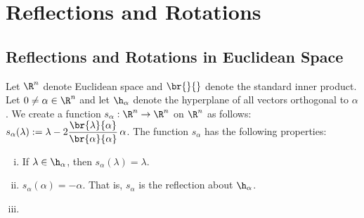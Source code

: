 
\section{Reflections and Rotations}
\subsection{Reflections and Rotations in Euclidean Space}

Let $\R^n$ denote Euclidean space and $\br{}{}$ denote the standard inner product. Let $0 \neq \alpha \in \R^n$ and let $\h_\alpha$ denote the hyperplane of all vectors orthogonal to $\alpha$. We create a function $s_\alpha: \R^n \to \R^n$ on $\R^n$ as follows: $s_\alpha(\lambda):= \lambda - 2 \dfrac{\br{\lambda}{\alpha}}{\br{\alpha}{\alpha}} \, \alpha$. The function $s_\alpha$ has the following properties:

\begin{enumerate}[(i)]
\item If $\lambda \in \h_\alpha$, then $s_\alpha(\lambda)=\lambda$.
\item $s_\alpha(\alpha)= -\alpha$. That is, $s_\alpha$ is the reflection about $\h_\alpha$.
\item 
\end{enumerate}

















































